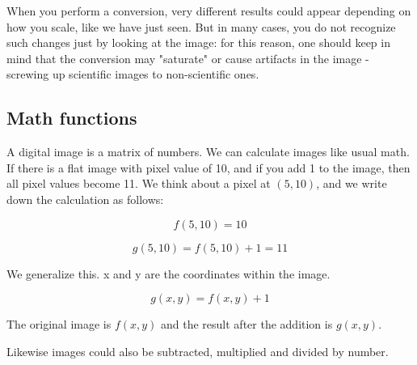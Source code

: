 When you perform a conversion, very different results could appear depending on
how you scale, like we have just seen. But in many cases, you do not
recognize such changes just by looking at the image: for this reason,
one should keep in mind that the conversion may
"saturate" or cause artifacts in the image
- screwing up scientific images to non-scientific ones. 


\subsection{Math functions}

A digital image is a matrix of numbers. We can calculate images like usual
math. If there is a flat image with pixel value of 10, and if you add 1
to the image, then all pixel values become 11. We think about a pixel
at $(5, 10)$, and we write down the calculation as follows:

\begin{equation}
f(5, 10) = 10
\end{equation}

\begin{equation}
g(5,10) = f (5, 10) +1 = 11
\end{equation}

We generalize this. x and y are the coordinates within the image.

\begin{equation}
g( x , y ) = f (x, y) + 1
\end{equation}

The original image is $f(x, y)$ and the result after the addition
is $g(x, y)$. 

Likewise images could also be subtracted, multiplied and divided by
number. 

